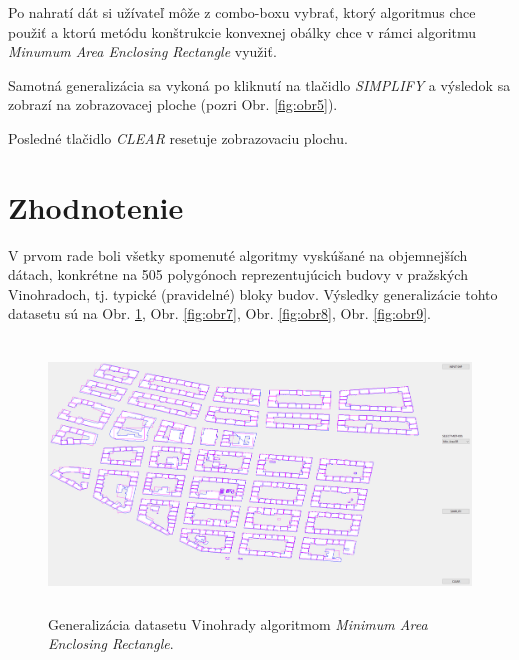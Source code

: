 \documentclass[11pt]{article}
\begin{document}

\noindent Po nahratí dát si užívateľ môže z combo-boxu vybrať, ktorý algoritmus chce použiť a ktorú metódu konštrukcie konvexnej obálky chce v rámci algoritmu \textit{Minumum Area Enclosing Rectangle} využiť.

\noindent Samotná generalizácia sa vykoná po kliknutí na tlačidlo \textit{SIMPLIFY} a výsledok sa zobrazí na zobrazovacej ploche (pozri Obr. \ref{fig:obr5}).

\noindent Posledné tlačidlo \textit{CLEAR} resetuje zobrazovaciu plochu.

\newpage


\section{Zhodnotenie}
V prvom rade boli všetky spomenuté algoritmy vyskúšané na objemnejších dátach, konkrétne na 505 polygónoch reprezentujúcich budovy v pražských Vinohradoch, tj. typické (pravidelné) bloky budov.  
Výsledky generalizácie tohto datasetu sú na Obr. \ref{fig:obr6}, Obr. \ref{fig:obr7}, Obr. \ref{fig:obr8}, Obr. \ref{fig:obr9}.
\begin{figure}[h]
\captionsetup{justification=centering}
\centering
\includegraphics[width=14.65cm, height=7.2cm]{images/vinohrady_maer.png}
\caption{Generalizácia datasetu Vinohrady algoritmom \textit{Minimum Area Enclosing Rectangle}.}
\label{fig:obr6}
\end{figure}
\end{document}
